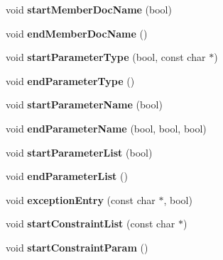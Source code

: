 \begin{DoxyCompactItemize}
void {\bfseries start\+Member\+Doc\+Name} (bool)
\item 
\mbox{\label{class_r_t_f_generator_acfea2f35d2c8a760082bc8ad6d0e18fc}} 
void {\bfseries end\+Member\+Doc\+Name} ()
\item 
\mbox{\label{class_r_t_f_generator_a62b97ac9e8fb0b5b1f43258dab52a221}} 
void {\bfseries start\+Parameter\+Type} (bool, const char $\ast$)
\item 
\mbox{\label{class_r_t_f_generator_afa91e226899991dfdc3996ee1f6f87c2}} 
void {\bfseries end\+Parameter\+Type} ()
\item 
\mbox{\label{class_r_t_f_generator_adb57207e0840acb6350fef7e23604657}} 
void {\bfseries start\+Parameter\+Name} (bool)
\item 
\mbox{\label{class_r_t_f_generator_acc9e432934e2b1decdf1be6dbaa4f5f2}} 
void {\bfseries end\+Parameter\+Name} (bool, bool, bool)
\item 
\mbox{\label{class_r_t_f_generator_a2739446e6fe0e80105d5a0f010e46a6f}} 
void {\bfseries start\+Parameter\+List} (bool)
\item 
\mbox{\label{class_r_t_f_generator_a14ea701758cd22aac57c4701b91b3094}} 
void {\bfseries end\+Parameter\+List} ()
\item 
\mbox{\label{class_r_t_f_generator_abf4fe54e26bf5f3e362cab1f0825b6a5}} 
void {\bfseries exception\+Entry} (const char $\ast$, bool)
\item 
\mbox{\label{class_r_t_f_generator_a2f057ad3fcf66b3c6a736fe1bc0c891c}} 
void {\bfseries start\+Constraint\+List} (const char $\ast$)
\item 
\mbox{\label{class_r_t_f_generator_a0dece267723511baafa87912d4a348f5}} 
void {\bfseries start\+Constraint\+Param} ()
\item 
\mbox{\label{class_r_t_f_generator_a0f1f278d86d5c44964308faaaea24b1b}} 

\end{DoxyCompactItemize}
